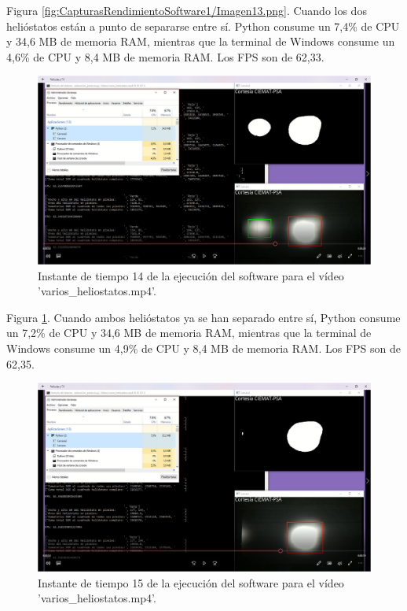 Figura \ref{fig:CapturasRendimientoSoftware1/Imagen13.png}. Cuando los dos helióstatos están a punto de separarse entre sí. Python consume un 7,4\% de CPU y 34,6 MB de memoria RAM, mientras que la terminal de Windows consume un 4,6\% de CPU y 8,4 MB de memoria RAM. Los FPS son de 62,33.\\[20pt]

\begin{figure}[h!]
  	\centering
	\includegraphics[width=\textwidth]{CapturasRendimientoSoftware1/Imagen14.png}
	\caption{Instante de tiempo 14 de la ejecución del software para el vídeo 'varios\_heliostatos.mp4'.
	\label{fig:CapturasRendimientoSoftware1/Imagen14.png}}
\end{figure}

Figura \ref{fig:CapturasRendimientoSoftware1/Imagen14.png}. Cuando ambos helióstatos ya se han separado entre sí, Python consume un 7,2\% de CPU y 34,6 MB de memoria RAM, mientras que la terminal de Windows consume un 4,9\% de CPU y 8,4 MB de memoria RAM. Los FPS son de 62,35.\\[20pt]

\begin{figure}[h!]
  	\centering
	\includegraphics[width=\textwidth]{CapturasRendimientoSoftware1/Imagen15.png}
	\caption{Instante de tiempo 15 de la ejecución del software para el vídeo 'varios\_heliostatos.mp4'.
	\label{fig:CapturasRendimientoSoftware1/Imagen15.png}}
\end{figure}


